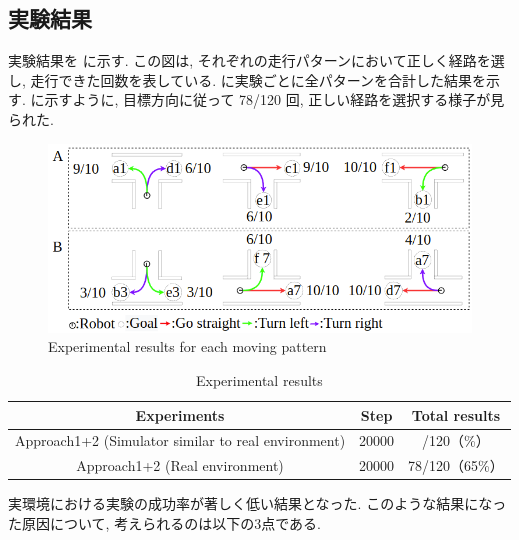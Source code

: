 \subsection{実験結果}
実験結果を  に示す. この図は, それぞれの走行パターンにおいて正しく経路を選し, 走行できた回数を表している.  に実験ごとに全パターンを合計した結果を示す.  に示すように, 目標方向に従って 78/120 回, 正しい経路を選択する様子が見られた.

\begin{figure}[hbtp]
  \centering
 \includegraphics[keepaspectratio, scale=0.5]
      {images/real_result.png}
 \caption{Experimental results for each moving pattern}
 \label{Fig:real_result}
\end{figure}

\begin{table}[hbtp]
  \caption{Experimental results}
  \label{table:real}
  \centering
  \begin{tabular}{|c|c|c|}
    \hline
    Experiments & Step & Total results\\
    \hline
    Approach1+2 (Simulator similar to real environment) & 20000 & /120（\%）\\
    \hline
    Approach1+2 (Real environment) & 20000 & 78/120（65\%）\\
    \hline
  \end{tabular}
\end{table}

実環境における実験の成功率が著しく低い結果となった. このような結果になった原因について, 考えられるのは以下の3点である.


